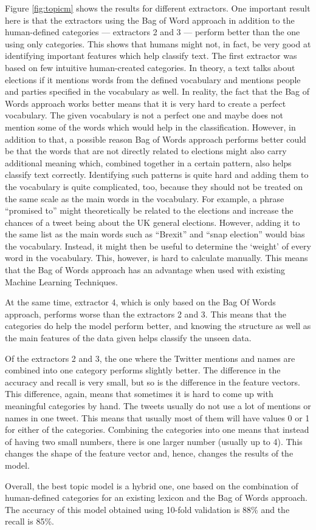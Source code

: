 Figure \ref{fig:topicm} shows the results for different extractors. One important result here is that the extractors using the Bag of Word approach in addition to the human-defined categories --- extractors 2 and 3 ---  perform better than the one using only categories. This shows that humans might not, in fact, be very good at identifying important features which help classify text. The first extractor was based on few intuitive human-created categories. In theory, a text talks about elections if it mentions words from the defined vocabulary and mentions people and parties specified in the vocabulary as well. In reality, the fact that the Bag of Words approach works better means that it is very hard to create a perfect vocabulary. The given vocabulary is not a perfect one and maybe does not mention some of the words which would help in the classification. However, in addition to that, a possible reason Bag of Words approach performs better could be that the words that are not directly related to elections might also carry additional meaning which, combined together in a certain pattern, also helps classify text correctly. Identifying such patterns is quite hard and adding them to the vocabulary is quite complicated, too, because they should not be treated on the same scale as the main words in the vocabulary. For example, a phrase ``promised to'' might theoretically be related to the elections and increase the chances of a tweet being about the UK general elections. However, adding it to the same list as the main words such as ``Brexit'' and ``snap election'' would bias the vocabulary. Instead, it might then be useful to determine the `weight' of every word in the vocabulary. This, however, is hard to calculate manually. This means that the Bag of Words approach has an advantage when used with existing Machine Learning Techniques.

At the same time, extractor 4, which is only based on the Bag Of Words approach, performs worse than the extractors 2 and 3. This means that the categories do help the model perform better, and knowing the structure as well as the main features of the data given helps classify the unseen data.

Of the extractors 2 and 3, the one where the Twitter mentions and names are combined into one category performs slightly better. The difference in the accuracy and recall is very small, but so is the difference in the feature vectors. This difference, again, means that sometimes it is hard to come up with meaningful categories by hand. The tweets usually do not use a lot of mentions or names in one tweet. This means that usually most of them will have values 0 or 1 for either of the categories. Combining the categories into one means that instead of having two small numbers, there is one larger number (usually up to 4). This changes the shape of the feature vector and, hence, changes the results of the model.

Overall, the best topic model is a hybrid one, one based on the combination of human-defined categories for an existing lexicon and the Bag of Words approach. The accuracy of this model obtained using 10-fold validation is 88\% and the recall is 85\%. 
